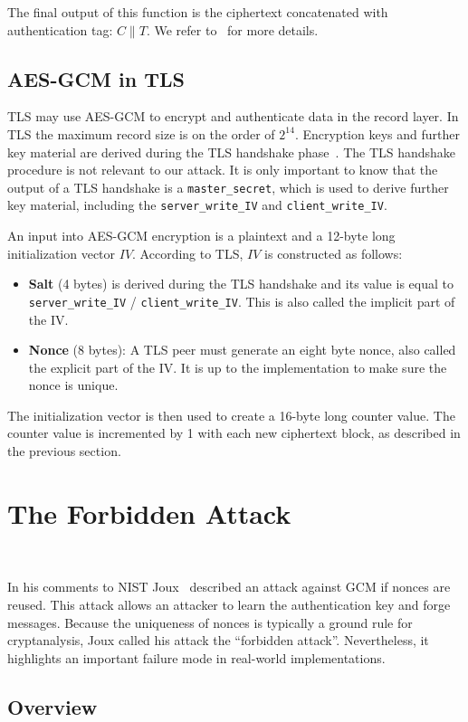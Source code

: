 The final output of this function is the ciphertext concatenated with authentication tag: $C \parallel T$.
We refer to~\cite{gcm-nist} for more details.


\subsection{AES-GCM in TLS}
TLS may use AES-GCM to encrypt and authenticate data in the record layer. In TLS the maximum record size is on the order of $2^{14}$. Encryption keys and further key material are derived during the TLS handshake phase~\cite{rfc5246}.
The TLS handshake procedure is not relevant to our attack. It is only important to know that the output of a TLS handshake is a \texttt{master\_secret},
which is used to derive further key material, including the \texttt{server\_write\_IV} and \texttt{client\_write\_IV}.

An input into AES-GCM encryption is a plaintext and a 12-byte long initialization vector $IV$. According to TLS, $IV$ is constructed as follows:
\begin{itemize}
	\item  \textbf{Salt} (4 bytes) is derived during the TLS handshake and its value is equal to  \texttt{server\_write\_IV} / \texttt{client\_write\_IV}. This is also called the implicit part of the IV.
	\item \textbf{Nonce} (8 bytes): A TLS peer must generate an eight byte nonce, also called the explicit part of the IV. It is up to the implementation to make sure the nonce is unique.
\end{itemize}
The initialization vector is then used to create a 16-byte long counter value. The counter value is incremented by 1 with each new ciphertext block, as described in the previous section.


\section{The Forbidden Attack}~\label{sec:forbidden}

In his comments to NIST Joux~\cite{joux2007} described an attack against GCM if nonces are reused. This attack allows an attacker to learn the authentication key and forge messages. Because the uniqueness of nonces is typically a ground rule for cryptanalysis, Joux called his attack the ``forbidden attack''. Nevertheless, it highlights an important
failure mode in real-world implementations.

\subsection{Overview}~\label{sec:overview}

